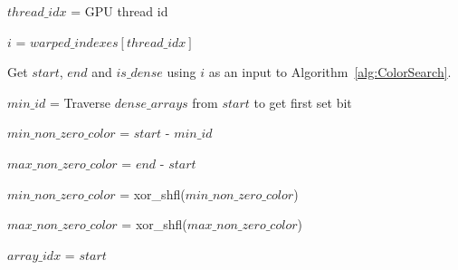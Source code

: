 \begin{algorithm}

  $\mathit{thread\_idx}$ = GPU thread id

  $i$ = $\mathit{warped\_indexes[thread\_idx]}$

  Get $\mathit{start}$, $\mathit{end}$ and $\mathit{is\_dense}$ using $i$ as an input to Algorithm~\ref{alg:ColorSearch}.

   {\newline

    $\mathit{min\_id}$ = Traverse $\mathit{dense\_arrays}$ from $\mathit{start}$ to get first set bit

    $\mathit{min\_non\_zero\_color}$ = $\mathit{start}$ - $\mathit{min\_id}$

    $\mathit{max\_non\_zero\_color}$ = $\mathit{end}$ - $\mathit{start}$

  }

  $\mathit{min\_non\_zero\_color}$ = xor\_shfl($\mathit{min\_non\_zero\_color}$)

  $\mathit{max\_non\_zero\_color}$ = xor\_shfl($\mathit{max\_non\_zero\_color}$)

  $\mathit{array\_idx}$ = $\mathit{start}$

\end{algorithm}
